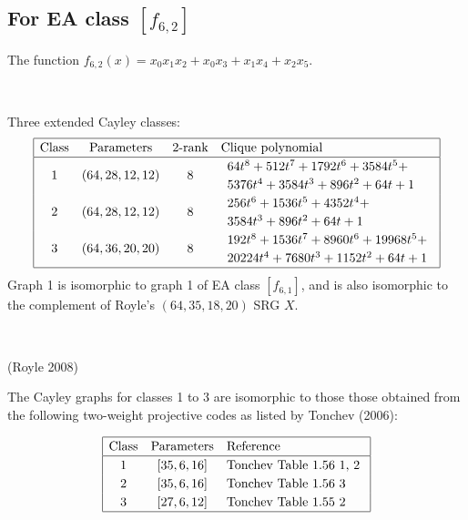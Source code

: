 \documentclass[12pt,a4paper]{article}
\newcommand{\slidecite}[1]{\tiny{(#1)}\normalsize{}}
\begin{document}
\subsection*{For EA class $[f_{6,2}]$}

The function
$f_{6,2}(x) = x_{0} x_{1} x_{2} + x_{0} x_{3} + x_{1} x_{4} + x_{2} x_{5}$.

~

Three extended Cayley classes:
\small{}
\begin{align*}
\def\arraystretch{1.2}
\begin{array}{|cccl|}
\hline
\text{Class} &
\text{Parameters} & 
\text{2-rank} &
\text{Clique polynomial}
\\
\hline
1 &
(64, 28, 12, 12) & 8 &
\begin{array}{l}
64t^{8} + 512t^{7} + 1792t^{6} + 3584t^{5} + 
\\
5376t^{4} + 3584t^{3} + 896t^{2} + 64t + 1
\end{array}
\\
2 &
(64, 28, 12, 12) & 8 & 
\begin{array}{l}
256t^{6} + 1536t^{5} + 4352t^{4} + 
\\
3584t^{3} + 896t^{2} + 64t + 1
\end{array}
\\
3 &
(64, 36, 20, 20) & 8 &
\begin{array}{l}
192t^{8} + 1536t^{7} + 8960t^{6} + 19968t^{5} +
\\
20224t^{4} + 7680t^{3} + 1152t^{2} + 64t + 1
\end{array}
\\
\hline
\end{array}
\end{align*}
Graph 1 is isomorphic to graph 1 of EA class $[f_{6,1}]$, and is also isomorphic to the complement of Royle's $(64,35,18,20)$ SRG $X$.

~

\slidecite{Royle 2008}

The Cayley graphs for classes 1 to 3 are isomorphic to those those obtained from the following two-weight projective
codes as listed by Tonchev (2006):

\begin{align*}
\begin{array}{|ccl|}
\hline
\text{Class} &
\text{Parameters} & \text{Reference}
\\
\hline
1 & [35,6,16] & \text{Tonchev Table 1.56 1, 2 }
\\
2 & [35,6,16] & \text{Tonchev Table 1.56 3 }
\\
3 & [27,6,12] & \text{Tonchev Table 1.55 2 }
\\
\hline
\end{array}
\end{align*}
\end{document}
